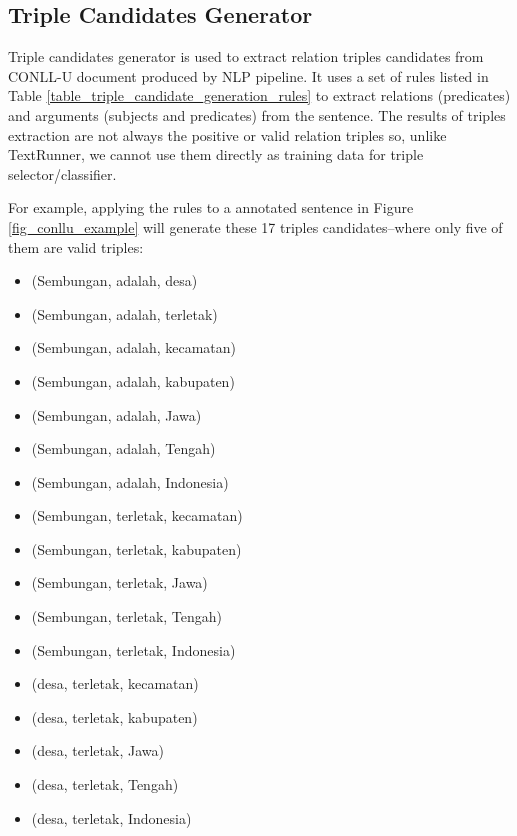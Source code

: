 \documentclass[conference,compsoc,12pt]{IEEEtran}
\begin{document}
\subsection{Triple Candidates Generator} \label{Triple Candidates Generator}


Triple candidates generator is used to extract relation triples candidates from CONLL-U document produced by NLP pipeline. It uses a set of rules listed in Table \ref{table_triple_candidate_generation_rules} to extract relations (predicates) and arguments (subjects and predicates) from the sentence. The results of triples extraction are not always the positive or valid relation triples so, unlike TextRunner\cite{banko2007open}, we cannot use them directly as training data for triple selector/classifier.

For example, applying the rules to a annotated sentence in Figure \ref{fig_conllu_example} will generate these 17 triples candidates--where only five of them are valid triples:

\begin{itemize}
\item (Sembungan, adalah, desa) 
\item (Sembungan, adalah, terletak)
\item (Sembungan, adalah, kecamatan)
\item (Sembungan, adalah, kabupaten)
\item (Sembungan, adalah, Jawa)
\item (Sembungan, adalah, Tengah)
\item (Sembungan, adalah, Indonesia)
\item (Sembungan, terletak, kecamatan) 
\item (Sembungan, terletak, kabupaten) 
\item (Sembungan, terletak, Jawa) 
\item (Sembungan, terletak, Tengah)
\item (Sembungan, terletak, Indonesia) 
\item (desa, terletak, kecamatan)
\item (desa, terletak, kabupaten)
\item (desa, terletak, Jawa)
\item (desa, terletak, Tengah)
\item (desa, terletak, Indonesia)
\end{itemize}
\end{document}
